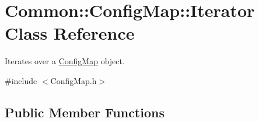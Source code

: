 \hypertarget{class_common_1_1_config_map_1_1_iterator}{\section{Common\-:\-:Config\-Map\-:\-:Iterator Class Reference}
\label{class_common_1_1_config_map_1_1_iterator}
}


Iterates over a \hyperlink{class_common_1_1_config_map}{Config\-Map} object.  




{\ttfamily \#include $<$Config\-Map.\-h$>$}

\subsection*{Public Member Functions}
